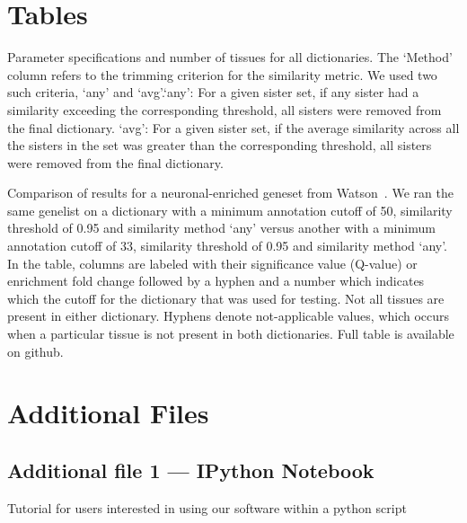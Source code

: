 \documentclass{bmcart}
\begin{document}
\begin{backmatter}

\section*{Tables}

\begin{table}[h!]
\caption{Parameter specifications and number of tissues for all dictionaries. The `Method' column refers to the trimming criterion for the similarity metric. We used two such criteria, `any' and `avg'.`any': For a given sister set, if any sister had a similarity exceeding the corresponding threshold, all sisters were removed from the final dictionary. `avg': For a given sister set, if the average similarity across all the sisters in the set was greater than the corresponding threshold, all sisters were removed from the final dictionary.}
	\label{tab:DictionarySpecs}
\end{table}

\begin{table}[h!]
	\caption{Comparison of results for a neuronal-enriched geneset from Watson~\cite{Watson2008a}. We ran the same genelist on a dictionary with a minimum annotation cutoff of 50, similarity threshold of 0.95 and similarity method `any' versus another with a minimum annotation cutoff of 33, similarity threshold of 0.95 and similarity method `any'. In the table, columns are labeled with their significance value (Q-value) or enrichment fold change followed by a hyphen and a number which indicates which the cutoff for the dictionary that was used for testing. Not all tissues are present in either dictionary. Hyphens denote not-applicable values, which occurs when a particular tissue is not present in both dictionaries. Full table is available on github.}
	\begin{adjustbox}{width=1\textwidth}
		\centering
		\label{tab:interagree}
	\end{adjustbox}
\end{table}


\section*{Additional Files}
  \subsection*{Additional file 1 --- IPython Notebook}
    Tutorial for users interested in using our software within a python script


\end{backmatter}
\end{document}
